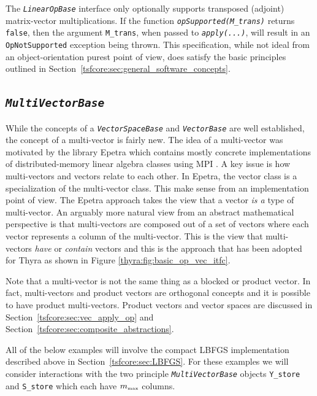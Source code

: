 \documentclass[pdf,ps2pdf,11pt]{SANDreport}
\begin{document}
The {}\texttt{\textit{Linear\-Op\-Base}} interface only optionally supports
transposed (adjoint) matrix-vector multiplications.  If the function
{}\texttt{\textit{opSupported(M\_trans)}} returns {}\texttt{false}, then the
argument {}\texttt{M\_trans}, when passed to {}\texttt{\textit{apply(\-...)}},
will result in an {}\texttt{OpNotSupported} exception being thrown.  This
specification, while not ideal from an object-orientation purest point of
view, does satisfy the basic principles outlined in
Section~\ref{tsfcore:sec:general_software_concepts}.

%
\subsection{\texttt{\textit{Multi\-Vector\-Base}}}
\label{tsfcore:sec:multi_vec}
%

While the concepts of a {}\texttt{\textit{Vector\-Space\-Base}} and
{}\texttt{\textit{Vector\-Base}} are well established, the concept of a
multi-vector is fairly new.  The idea of a multi-vector was motivated
by the library Epetra {}\cite{ref:Epetra} which contains mostly
concrete implementations of distributed-memory linear algebra classes
using MPI {}\cite{ref:mpi}.  A key issue is how multi-vectors and
vectors relate to each other.  In Epetra, the vector class is a
specialization of the multi-vector class.  This make sense from an
implementation point of view.  The Epetra approach takes the view that
a vector {\em is a} type of multi-vector.  An arguably more natural
view from an abstract mathematical perspective is that multi-vectors
are composed out of a set of vectors where each vector represents a
column of the multi-vector.  This is the view that multi-vectors {\em
have} or {\em contain} vectors and this is the approach that has been
adopted for Thyra as shown in Figure {}\ref{thyra:fig:basic_op_vec_itfc}.

Note that a multi-vector is not the same thing as a blocked or product vector.
In fact, multi-vectors and product vectors are orthogonal concepts and it is
possible to have product multi-vectors.  Product vectors and vector spaces are
discussed in Section~\ref{tsfcore:sec:vec_apply_op} and
Section~\ref{tsfcore:sec:composite_abstractions}.

All of the below examples will involve the compact LBFGS implementation
described above in Section~\ref{tsfcore:sec:LBFGS}.  For these examples we
will consider interactions with the two principle
{}\texttt{\textit{Multi\-Vector\-Base}} objects {}\texttt{Y\_store} and
{}\texttt{S\_store} which each have $m_{\tiny\mbox{max}}$ columns.
\end{document}
